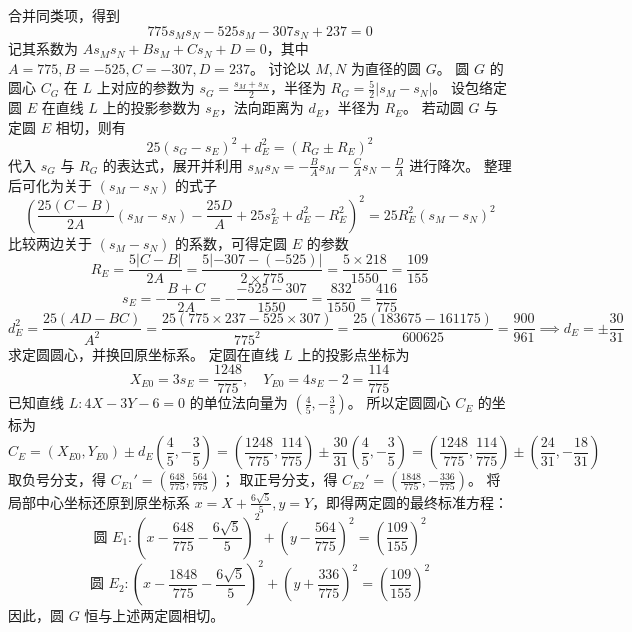 \begin{solution}
合并同类项，得到
$$ 775 s_M s_N - 525 s_M - 307 s_N + 237 = 0 $$
记其系数为 $A s_M s_N + B s_M + C s_N + D = 0$，其中 $A = 775, B = -525, C = -307, D = 237$。
讨论以 $M,N$ 为直径的圆 $G$。
圆 $G$ 的圆心 $C_G$ 在 $L$ 上对应的参数为 $s_G = \frac{s_M + s_N}{2}$，半径为 $R_G = \frac{5}{2}|s_M - s_N|$。
设包络定圆 $E$ 在直线 $L$ 上的投影参数为 $s_E$，法向距离为 $d_E$，半径为 $R_E$。
若动圆 $G$ 与定圆 $E$ 相切，则有
$$ 25(s_G - s_E)^2 + d_E^2 = (R_G \pm R_E)^2 $$
代入 $s_G$ 与 $R_G$ 的表达式，展开并利用 $s_M s_N = -\frac{B}{A} s_M - \frac{C}{A} s_N - \frac{D}{A}$ 进行降次。
整理后可化为关于 $(s_M - s_N)$ 的式子
$$ \left( \frac{25(C-B)}{2A} (s_M - s_N) - \frac{25D}{A} + 25 s_E^2 + d_E^2 - R_E^2 \right)^2 = 25 R_E^2 (s_M - s_N)^2 $$
比较两边关于 $(s_M - s_N)$ 的系数，可得定圆 $E$ 的参数
$$ R_E = \frac{5|C - B|}{2A} = \frac{5|-307 - (-525)|}{2 \times 775} = \frac{5 \times 218}{1550} = \frac{109}{155} $$
$$ s_E = -\frac{B + C}{2A} = -\frac{-525 - 307}{1550} = \frac{832}{1550} = \frac{416}{775} $$
$$ d_E^2 = \frac{25(AD - BC)}{A^2} = \frac{25(775 \times 237 - 525 \times 307)}{775^2} = \frac{25(183675 - 161175)}{600625} = \frac{900}{961} \implies d_E = \pm\frac{30}{31} $$
求定圆圆心，并换回原坐标系。
定圆在直线 $L$ 上的投影点坐标为
$$ X_{E0} = 3s_E = \frac{1248}{775}, \quad Y_{E0} = 4s_E - 2 = \frac{114}{775} $$
已知直线 $L: 4X - 3Y - 6 = 0$ 的单位法向量为 $\left(\frac{4}{5}, -\frac{3}{5}\right)$。
所以定圆圆心 $C_E$ 的坐标为
$$ C_E = (X_{E0}, Y_{E0}) \pm d_E \left(\frac{4}{5}, -\frac{3}{5}\right) = \left(\frac{1248}{775}, \frac{114}{775}\right) \pm \frac{30}{31}\left(\frac{4}{5}, -\frac{3}{5}\right) = \left(\frac{1248}{775}, \frac{114}{775}\right) \pm \left(\frac{24}{31}, -\frac{18}{31}\right) $$
取负号分支，得 $C_{E1}' = \left(\frac{648}{775}, \frac{564}{775}\right)$；
取正号分支，得 $C_{E2}' = \left(\frac{1848}{775}, -\frac{336}{775}\right)$。
将局部中心坐标还原到原坐标系 $x = X + \frac{6\sqrt{5}}{5}, y = Y$，即得两定圆的最终标准方程：
$$ \text{圆 } E_1: \left(x - \frac{648}{775} - \frac{6\sqrt{5}}{5}\right)^2 + \left(y - \frac{564}{775}\right)^2 = \left(\frac{109}{155}\right)^2 $$
$$ \text{圆 } E_2: \left(x - \frac{1848}{775} - \frac{6\sqrt{5}}{5}\right)^2 + \left(y + \frac{336}{775}\right)^2 = \left(\frac{109}{155}\right)^2 $$
因此，圆 $G$ 恒与上述两定圆相切。
\end{solution}


